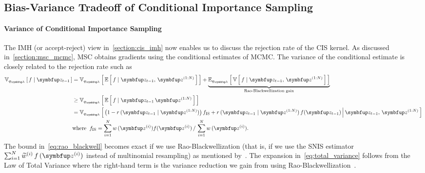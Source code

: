 
\subsection{Bias-Variance Tradeoff of Conditional Importance Sampling}\label{section:bias_variance}
\paragraph{Variance of Conditional Importance Sampling}
The IMH (or accept-reject) view in~\cref{section:cis_imh} now enables us to discuss the rejection rate of the CIS kernel.
As discussed in~\cref{section:msc_mcmc}, MSC obtains gradients using the conditional estimates of MCMC.
The variance of the conditional estimate is closely related to the rejection rate such as
\begin{align}
  \Vsub{q_{\vlambda}}{f \mid \vz_{t-1}} 
  &=\Vsub{q_{\vlambda}}{ \E{ f \mid \vz_{t-1},\,\vz^{(1:N)} } } + \underbrace{\Esub{q_{\vlambda}}{ \V{ f \mid \vz_{t-1},\,\vz^{(1:N)} } }}_{\text{Rao-Blackwellization gain}} \label{eq:total_variance} \\
  &\geq \Vsub{q_{\vlambda}}{ \E{ f \mid \vz_{t-1}\,\vz^{(1:N)} } } \label{eq:rao_blackwell}\\
  &= \Vsub{q_{\vlambda}}{ \big(1 - r\,(\vz_{t-1}\mid\vz^{(1:N)})\big)\, f_{\mathrm{IS}}
    + r\,(\vz_{t-1}\mid\vz^{(1:N)})\,f(\vz_{t-1}) \,\middle\vert\, \vz_{t-1},\, \vz^{(1:N)} } \label{eq:exact_variance} \\
  &\text{where}\;\; f_{\mathrm{IS}} = {\sum_{i=1}^N w\,(\vz^{(i)}) f(\vz^{(i)})\,/\,\sum_{i=1}^N w\,(\vz^{(i)})}. \nonumber 
\end{align}
%
The bound in~\eqref{eq:rao_blackwell} becomes exact if we use Rao-Blackwellization (that is, if we use the SNIS estimator \(\sum^{N}_{i=1} \widetilde{w}^{(i)}\,f\,(\vz^{(i)})\) instead of multinomial resampling) as mentioned by~\citet{NEURIPS2020_b2070693}.
The expansion in~\eqref{eq:total_variance} follows from the Law of Total Variance where the right-hand term is the variance reduction we gain from using Rao-Blackwellization~\citep{bernton_locally_2015}.

\vspace{-0.1in}
